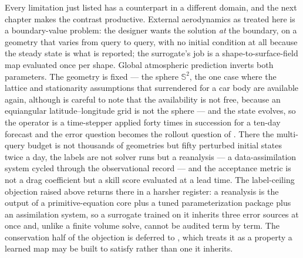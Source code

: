 Every limitation just listed has a counterpart in a different domain, and the next chapter
makes the contrast productive. External aerodynamics as treated here is a boundary-value
problem: the designer wants the solution \emph{at} the boundary, on a geometry that varies from
query to query, with no initial condition at all because the steady state is what is reported;
the surrogate's job is a shape-to-surface-field map evaluated once per shape. Global atmospheric
prediction inverts both parameters. The geometry is
fixed --- the sphere $\mathbb{S}^2$, the one case where the lattice and stationarity assumptions
that  surrendered for a car body are
available again, although  is careful
to note that the availability is not free, because an equiangular latitude--longitude grid is not
the sphere --- and the state evolves, so the operator is a time-stepper applied forty times in
succession for a ten-day forecast and the error question becomes the rollout question of
. There the multi-query budget is
not thousands of geometries but fifty perturbed initial states twice a day, the labels are not
solver runs but a reanalysis --- a data-assimilation system cycled through the observational
record --- and the acceptance metric is not a drag coefficient but a skill score evaluated at a
lead time. The label-ceiling objection raised above returns there in a harsher register: a
reanalysis is the output of a primitive-equation core plus a tuned parameterization package plus
an assimilation system, so a surrogate trained on it inherits three error sources at once and,
unlike a finite volume solve, cannot be audited term by term. The conservation half of the
objection is deferred to , which
treats it as a property a learned map may be built to satisfy rather than one it inherits.

